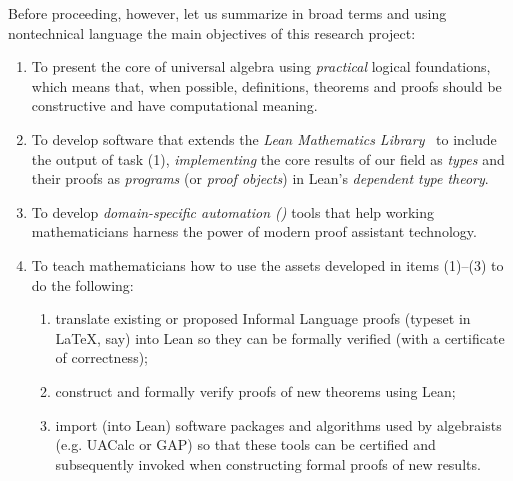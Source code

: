 \documentclass[12pt]{amsart}  %
\begin{document}
Before proceeding, however, let us summarize in broad terms and using nontechnical language the main objectives of this research project:
\begin{enumerate}[{\bf 1.}]
  \item To present the core of universal algebra using \emph{practical} logical foundations, which means that, when possible, definitions, theorems and proofs should be constructive and have computational meaning.
  
  \item To develop software that extends the \emph{Lean Mathematics Library}~\cite{lean-mathlib:2018} to include the output of task (1), \emph{implementing} the core results of our field as \emph{types} and their proofs as \emph{programs} (or \emph{proof objects}) in Lean's \emph{dependent type theory}.
        
  \item To develop \emph{domain-specific automation (\dsa)} tools that help working mathematicians harness the power of modern proof assistant technology.
        
  \item To teach mathematicians how to use the assets developed in items (1)--(3)
        to do the following:
  \begin{enumerate}[{\bf a.}]
    \item translate existing or proposed Informal Language proofs (typeset in \LaTeX, say) into Lean so they can be formally verified (with a certificate of correctness);
    \item construct and formally verify proofs of new theorems using Lean;
    \item import (into Lean) software packages and algorithms used by algebraists 
    (e.g. UACalc or GAP) so that these tools can be certified and subsequently 
    invoked when constructing formal proofs of new results.
  \end{enumerate}
\end{enumerate}




\end{document}
